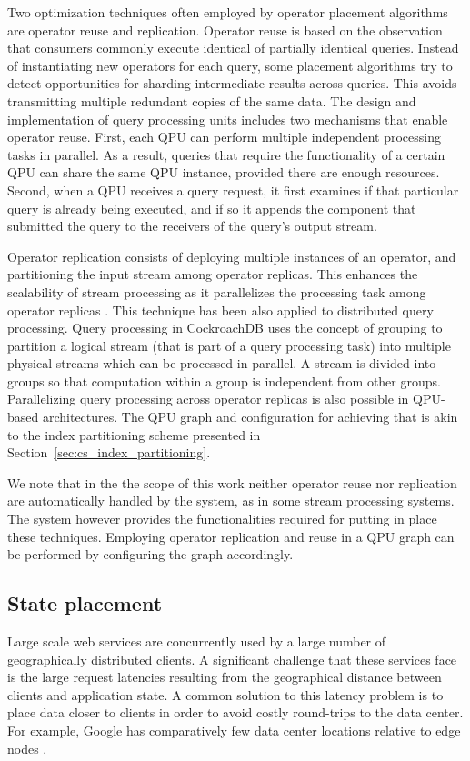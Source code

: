 \bigskip
\noindent
Two optimization techniques often employed by operator placement algorithms are operator reuse and replication.
Operator reuse is based on the observation that consumers commonly execute identical of partially identical queries.
Instead of instantiating new operators for each query,
some placement algorithms \cite{pietzuch:networkawareopplacement} try to detect opportunities for sharding intermediate results across queries.
This avoids transmitting multiple redundant copies of the same data.
The design and implementation of query processing units includes two mechanisms that enable operator reuse.
First, each QPU can perform multiple independent processing tasks in parallel.
As a result, queries that require the functionality of a certain QPU can share the same QPU instance,
provided there are enough resources.
Second, when a QPU receives a query request, it first examines if that particular query is already being executed,
and if so it appends the component that submitted the query to the receivers of the query's output stream.

Operator replication consists of deploying multiple instances of an operator,
and partitioning the input stream among operator replicas.
This enhances the scalability of stream processing as it parallelizes the processing task among operator replicas
\cite{stonebraker:streamprocessingrequirements}.
This technique has been also applied to distributed query processing.
Query processing in CockroachDB \cite{cockroachdb:distsql} uses the concept of grouping to partition a logical stream
(that is part of a query processing task) into multiple physical streams which can be processed in parallel.
A stream is divided into groups so that computation within a group is independent from other groups.
Parallelizing query processing across operator replicas is also possible in QPU-based architectures.
The QPU graph and configuration for achieving that is akin to the index partitioning scheme presented in Section~\ref{sec:cs_index_partitioning}.

We note that in the the scope of this work neither operator reuse nor replication are automatically handled by the system,
as in some stream processing systems.
The system however provides the functionalities required for putting in place these techniques.
Employing operator replication and reuse in a QPU graph can be performed by configuring the graph accordingly.

\subsection{State placement}
Large scale web services are concurrently used by a large number of geographically distributed clients.
A significant challenge that these services face is the large request latencies resulting from the geographical distance
between clients and application state.
A common solution to this latency problem is to place data closer to clients in order to avoid costly round-trips
to the data center.
For example, Google has comparatively few data center locations relative to edge nodes \cite{google:infra}.

